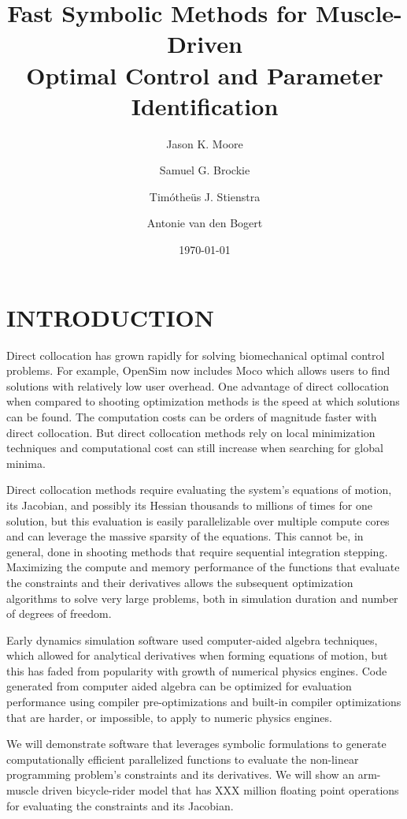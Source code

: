 \documentclass[11pt,twocolumn]{article}
\title{Fast Symbolic Methods for Muscle-Driven\\Optimal Control and Parameter
Identification}
\author{Jason K. Moore \and Samuel G. Brockie \and Timótheüs J. Stienstra \and Antonie van den Bogert}
\date{\today}
\begin{document}
\maketitle
\section*{INTRODUCTION}
%
Direct collocation has grown rapidly for solving biomechanical optimal control
problems. For example, OpenSim now includes Moco which allows users to find
solutions with relatively low user overhead. One advantage of direct
collocation when compared to shooting optimization methods is the speed at
which solutions can be found. The computation costs can be orders of
magnitude faster with direct collocation. But direct collocation methods
rely on local minimization techniques and computational cost can still increase when
searching for global minima.

Direct collocation methods require evaluating the system's equations of motion,
its Jacobian, and possibly its Hessian thousands to millions of times for one
solution, but this evaluation is easily parallelizable over multiple compute
cores and can leverage the massive sparsity of the equations. This cannot be,
in general, done in shooting methods that require sequential integration
stepping. Maximizing the compute and memory performance of the functions that
evaluate the constraints and their derivatives allows the subsequent
optimization algorithms to solve very large problems, both in simulation
duration and number of degrees of freedom.

Early dynamics simulation software used computer-aided algebra techniques,
which allowed for analytical derivatives when forming equations of motion, but
this has faded from popularity with growth of numerical physics engines. Code
generated from computer aided algebra can be optimized for evaluation
performance using compiler pre-optimizations and built-in compiler
optimizations that are harder, or impossible, to apply to numeric physics
engines.

We will demonstrate software that leverages symbolic formulations to generate
computationally efficient parallelized functions to evaluate the non-linear
programming problem's constraints and its derivatives. We will show an
arm-muscle driven bicycle-rider model that has XXX million floating point
operations for evaluating the constraints and its Jacobian.
\end{document}
